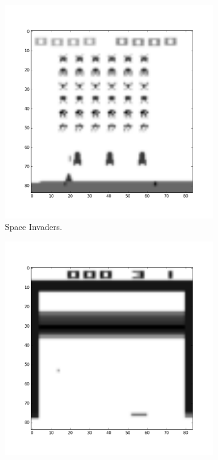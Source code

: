 \documentclass[11pt]{article}
\begin{document}
\begin{figure}[H]
    \begin{subfigure}{.3\textwidth}
        \centering
        \includegraphics[scale=0.23]{include/space_invaders_1_gray_resized.png}
        \caption{Space Invaders.}
        \label{fig:scan}
    \end{subfigure}
    \begin{subfigure}{.3\textwidth}
        \centering
        \includegraphics[scale=0.23]{include/breakout_1_gray_resized.png}

\end{subfigure}
\end{figure}
\end{document}
